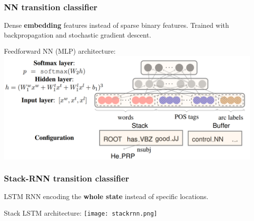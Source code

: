 \documentclass[t]{beamer}
\begin{document}
\begin{frame}
    \frametitle{NN transition classifier \cite{chen2014fast}}
    Dense \textbf{embedding} features instead of sparse binary features.
    Trained with backpropagation and stochastic gradient descent.
    
    \vfill
    
    Feedforward NN (MLP) architecture:
    \includegraphics[width=\textwidth,height=\textheight,keepaspectratio]{nn.png}
\end{frame}

\begin{frame}
    \frametitle{Stack-RNN transition classifier \cite{dyer2015transition}}
    LSTM RNN encoding the \textbf{whole state} instead of specific locations.
    
    \vfill
    
    Stack LSTM architecture:
    \texttt{[image: stackrnn.png]}
\end{frame}
\end{document}
